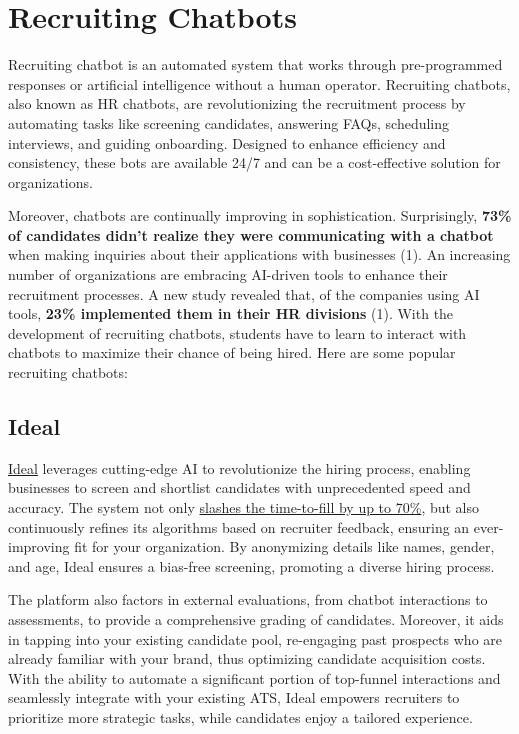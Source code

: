 \documentclass[
]{book}
\begin{document}
\hypertarget{recruiting-chatbots}{%
\chapter{Recruiting Chatbots}\label{recruiting-chatbots}}

Recruiting chatbot is an automated system that works through pre-programmed responses or artificial intelligence without a human operator. Recruiting chatbots, also known as HR chatbots, are revolutionizing the recruitment process by automating tasks like screening candidates, answering FAQs, scheduling interviews, and guiding onboarding. Designed to enhance efficiency and consistency, these bots are available 24/7 and can be a cost-effective solution for organizations.

Moreover, chatbots are continually improving in sophistication. Surprisingly, \textbf{73\% of candidates didn't realize they were communicating with a chatbot} when making inquiries about their applications with businesses (1). An increasing number of organizations are embracing AI-driven tools to enhance their recruitment processes. A new study revealed that, of the companies using AI tools, \textbf{23\% implemented them in their HR divisions} (1). With the development of recruiting chatbots, students have to learn to interact with chatbots to maximize their chance of being hired. Here are some popular recruiting chatbots:

\hypertarget{ideal}{%
\section{Ideal}\label{ideal}}

\href{https://ideal.com/}{Ideal} leverages cutting-edge AI to revolutionize the hiring process, enabling businesses to screen and shortlist candidates with unprecedented speed and accuracy. The system not only \href{https://ideal.com/product/recruiting-chatbot/}{slashes the time-to-fill by up to 70\%}, but also continuously refines its algorithms based on recruiter feedback, ensuring an ever-improving fit for your organization. By anonymizing details like names, gender, and age, Ideal ensures a bias-free screening, promoting a diverse hiring process.

The platform also factors in external evaluations, from chatbot interactions to assessments, to provide a comprehensive grading of candidates. Moreover, it aids in tapping into your existing candidate pool, re-engaging past prospects who are already familiar with your brand, thus optimizing candidate acquisition costs. With the ability to automate a significant portion of top-funnel interactions and seamlessly integrate with your existing ATS, Ideal empowers recruiters to prioritize more strategic tasks, while candidates enjoy a tailored experience.
\end{document}
